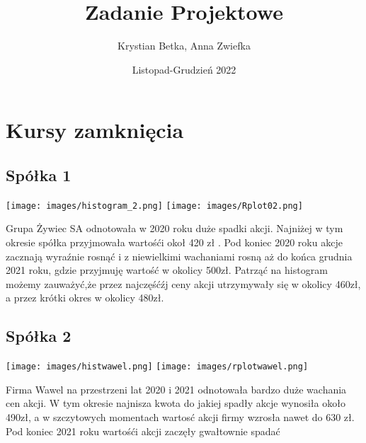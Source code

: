 \documentclass[a4paper,11pt]{article}
\begin{document}
\begin{titlepage}

\title{Zadanie Projektowe}
\author{Krystian Betka, Anna Zwiefka}
\date{Listopad-Grudzień 2022}
\maketitle
\end{titlepage}




\section{Kursy zamknięcia }
\subsection{Spółka 1}


\begin{center}
\texttt{[image: images/histogram\_2.png]}
\texttt{[image: images/Rplot02.png]}
\end{center}

\begin{flushleft}
{Grupa Żywiec SA odnotowała w 2020 roku duże spadki akcji. Najniżej  w tym okresie spółka przyjmowała wartośći okoł 420 zł . Pod koniec 2020 roku akcje zacznają wyraźnie rosnąć i z niewielkimi wachaniami rosną aż do końca grudnia 2021 roku, gdzie przyjmuję wartość w okolicy 500zł.}
{Patrząć na histogram możemy zauważyć,że przez najczęśćźj ceny akcji utrzymywały się w okolicy 460zł, a przez krótki okres w okolicy 480zł.}
\end{flushleft}

\subsection{Spółka 2}

\begin{center}
\texttt{[image: images/histwawel.png]}
\texttt{[image: images/rplotwawel.png]}
\end{center}

\begin{flushleft}
{Firma Wawel na przestrzeni lat 2020 i 2021 odnotowała bardzo duże wachania cen akcji.
W tym okresie najnisza kwota do jakiej spadły akcje wynosiła około 490zł, a w szczytowych momentach wartosć akcji firmy wzrosła nawet do 630 zł.}
{Pod koniec 2021 roku wartośći akcji zaczęły gwałtownie spadać  }
\end{flushleft}
\end{document}
